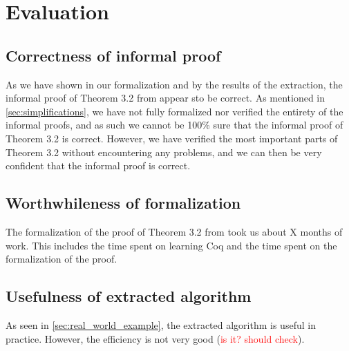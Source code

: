 \chapter{Evaluation}

\section{Correctness of informal proof}

As we have shown in our formalization and by the results of the
extraction, the informal proof of Theorem 3.2 from \cite{mbezem} appear sto be correct.
As mentioned in \autoref{sec:simplifications}, we have not fully formalized nor verified the entirety of the informal proofs,
and as such we cannot be 100\% sure that the informal proof of Theorem 3.2 is correct.
However, we have verified the most important parts of Theorem 3.2 without
encountering any problems, and we can then be very confident that the informal proof is correct.

\section{Worthwhileness of formalization}

The formalization of the proof of Theorem 3.2 from \cite{mbezem} took us about X months of work.
This includes the time spent on learning Coq and the time spent on the formalization of the proof.

\section{Usefulness of extracted algorithm}

As seen in \autoref{sec:real_world_example}, the extracted algorithm is useful in practice.
However, the efficiency is not very good (\textcolor{red}{is it? should check}).
